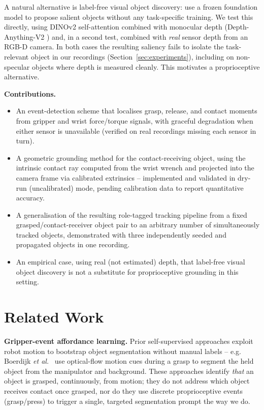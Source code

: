 \documentclass[letterpaper, 10pt, journal, twoside]{IEEEtran}
\begin{document}
A natural alternative is label-free visual object discovery: use a
frozen foundation model to propose salient objects without any
task-specific training. We test this directly, using DINOv2
\cite{oquab2023dinov2} self-attention combined with monocular depth
(Depth-Anything-V2 \cite{yang2024depthanythingv2}) and, in a second test,
combined with \emph{real} sensor depth from an RGB-D camera. In both
cases the resulting saliency fails to isolate the task-relevant object in
our recordings (Section~\ref{sec:experiments}), including on non-specular
objects where depth is measured cleanly. This motivates a proprioceptive
alternative.

\textbf{Contributions.}
\begin{itemize}
  \item An event-detection scheme that localises grasp, release, and
        contact moments from gripper and wrist force/torque signals,
        with graceful degradation when either sensor is unavailable
        (verified on real recordings missing each sensor in turn).
  \item A geometric grounding method for the contact-receiving object,
        using the intrinsic contact ray \cite{bicchi1990} computed from
        the wrist wrench and projected into the camera frame via
        calibrated extrinsics -- implemented and validated in dry-run
        (uncalibrated) mode, pending calibration data to report
        quantitative accuracy.
  \item A generalisation of the resulting role-tagged tracking pipeline
        from a fixed grasped/contact-receiver object pair to an
        arbitrary number of simultaneously tracked objects, demonstrated
        with three independently seeded and propagated objects in one
        recording.
  \item An empirical case, using real (not estimated) depth, that
        label-free visual object discovery is not a substitute for
        proprioceptive grounding in this setting.
\end{itemize}

\section{Related Work}

\textbf{Gripper-event affordance learning.} Prior self-supervised
approaches exploit robot motion to bootstrap object segmentation without
manual labels -- e.g. Boerdijk \emph{et al.}~\cite{boerdijk2021gripper} use
optical-flow motion cues during a grasp to segment the held object from
the manipulator and background. These approaches identify \emph{that} an
object is grasped, continuously, from motion; they do not address which
object receives contact once grasped, nor do they use discrete
proprioceptive events (grasp/press) to trigger a single, targeted
segmentation prompt the way we do.
\end{document}
